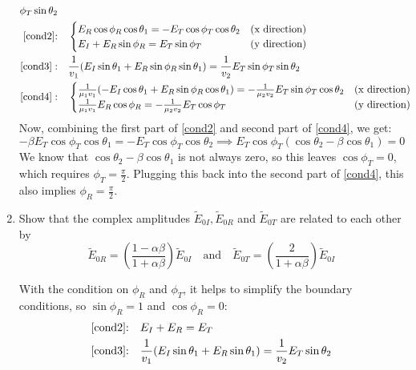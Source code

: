\documentclass[10pt]{article}
\begin{document}
\begin{enumerate}[label=(\alph*)]
\begin{solution}
\begin{align*}
					\phi_T \sin \theta_2\\
					\text{\ref{cond2}:}& \quad \begin{cases}
						E_R \cos \phi_R \cos \theta_1 = - E_T \cos \phi_T \cos \theta_2 & \text{(x
						direction)}\\
						E_I + E_R \sin \phi_R = E_T \sin \phi_T & \text{(y direction)}
					\end{cases}\\
					\ref{cond3}:& \quad \frac{1}{v_1}(E_I \sin \theta_1 + E_R \sin \phi_R \sin \theta_1) =
					\frac{1}{v_2}E_T \sin \phi_T \sin \theta_2\\
					\ref{cond4}:& \quad \begin{cases}
						\frac{1}{\mu_1v_1}(-E_I \cos \theta_1 + 
						E_R \sin \phi_R \cos \theta_1) =
						-\frac{1}{\mu_2v_2}E_T \sin \phi_T \cos \theta_2 & \text{(x direction)}\\
						\frac{1}{\mu_1v_1}E_R \cos \phi_R = -\frac{1}{\mu_2v_2}E_T \cos \phi_T & \text{(y
						direction)}
					\end{cases}
				\end{align*}
				Now, combining the first part of \ref{cond2} and second part of \ref{cond4}, we get:
				\[
					-\beta E_T \cos \phi_T \cos \theta_1 = - E_T \cos \phi_T \cos \theta_2 \implies E_T \cos
					\phi_T(\cos \theta_2 - \beta \cos \theta_1) = 0
				\]
				We know that \( \cos \theta_2 - \beta \cos \theta_1 \) is not always zero, so this leaves \(
				\cos \phi_T = 0 \), which requires \( \phi_T = \frac{\pi}{2} \). Plugging this back into the
				second part of \ref{cond4}, this also implies \( \phi_R = \frac{\pi}{2} \). 
			\end{solution}
		\item Show that the complex amplitudes \( \tilde E_{0I}, \tilde E_{0R} \) and \( \tilde E_{0T} \) are
			related to each other by 
			\[
				\tilde E_{0R} = \left( \frac{1 - \alpha \beta}{1 + \alpha \beta} \right)\tilde E_{0I} \quad
				\text{and} \quad \tilde E_{0T} = \left( \frac{2}{1 + \alpha \beta} \right)\tilde E_{0I}
			\]
			\begin{solution}
				With the condition on \( \phi_R \) and \( \phi_T \), it helps to simplify the boundary
				conditions, so \( \sin \phi_R = 1 \) and \( \cos \phi_R = 0 \):
				\begin{align*}
					\text{\ref{cond2}:}& \quad E_I + E_R = E_T\\
					\text{\ref{cond3}:}&\quad \frac{1}{v_1}(E_I \sin \theta_1 + E_R \sin \theta_1) =
					\frac{1}{v_2}E_T \sin \theta_2\\

\end{align*}
\end{solution}
\end{enumerate}
\end{document}
